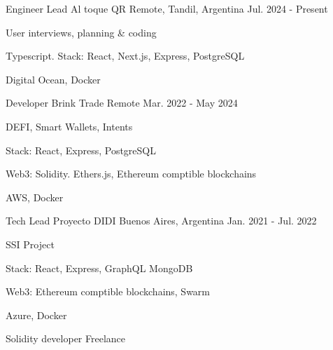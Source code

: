 


\begin{cventries}
\cventry
{Engineer Lead} %
{Al toque QR} %
{Remote, Tandil, Argentina} %
{Jul. 2024 - Present} %
{ %
\begin{cvitems}
\item {User interviews, planning \& coding}
\item {Typescript. Stack: React, Next.js, Express, PostgreSQL}
\item {Digital Ocean, Docker}
\end{cvitems}
}
\cventry
{Developer} %
{Brink Trade} %
{Remote} %
{Mar. 2022 - May 2024} %
{ %
\begin{cvitems}
\item {DEFI, Smart Wallets, Intents}
\item {Stack: React, Express, PostgreSQL}
\item {Web3: Solidity. Ethers.js, Ethereum comptible blockchains}
\item {AWS, Docker}
\end{cvitems}
}
\cventry
{Tech Lead} %
{Proyecto DIDI} %
{Buenos Aires, Argentina} %
{Jan. 2021 - Jul. 2022} %
{ %
\begin{cvitems}
\item {SSI Project}
\item {Stack: React, Express, GraphQL MongoDB}
\item {Web3: Ethereum comptible blockchains, Swarm}
\item {Azure, Docker}
\end{cvitems}
}
\cventry
{Solidity developer} %
{Freelance} %

\end{cventries}

